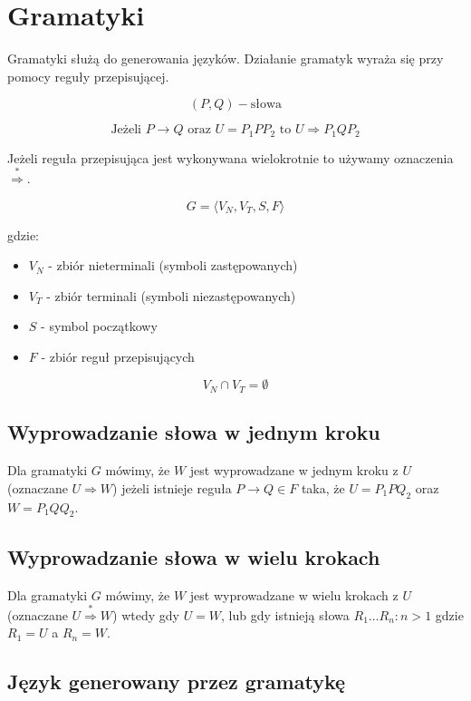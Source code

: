 \documentclass{../notatki}
\begin{document}
\section{Gramatyki}

Gramatyki służą do generowania języków.
Działanie gramatyk wyraża się przy pomocy reguły przepisującej.

$$
(P, Q) - \text{słowa}
$$

$$
\text{Jeżeli } P \rightarrow Q \text{ oraz } U = P_1PP_2 \text{ to } U \Rightarrow P_1QP_2
$$

Jeżeli reguła przepisująca jest wykonywana wielokrotnie to używamy oznaczenia $\stackrel{*}{\Rightarrow}$.

$$
G = \langle V_N, V_T, S, F \rangle
$$

gdzie:

\begin{itemize}
    \item $V_N$ - zbiór nieterminali (symboli zastępowanych)
    \item $V_T$ - zbiór terminali (symboli niezastępowanych)
    \item $S$ - symbol początkowy
    \item $F$ - zbiór reguł przepisujących
\end{itemize}

$$
V_N \cap V_T = \emptyset
$$

\subsection{Wyprowadzanie słowa w jednym kroku}

Dla gramatyki $G$ mówimy, że $W$ jest wyprowadzane w jednym kroku z $U$ (oznaczane $U \Rightarrow W$) jeżeli istnieje reguła $P \rightarrow Q \in F$ taka, że $U = P_1PQ_2$ oraz $W = P_1QQ_2$.

\subsection{Wyprowadzanie słowa w wielu krokach}

Dla gramatyki $G$ mówimy, że $W$ jest wyprowadzane w wielu krokach z $U$ (oznaczane $U \stackrel{*}{\Rightarrow} W$) wtedy gdy $U=W$, lub gdy istnieją słowa $R_1 \dots R_n : n > 1$ gdzie $R_1 = U$ a $R_n=W$.

\subsection{Język generowany przez gramatykę}
\end{document}

